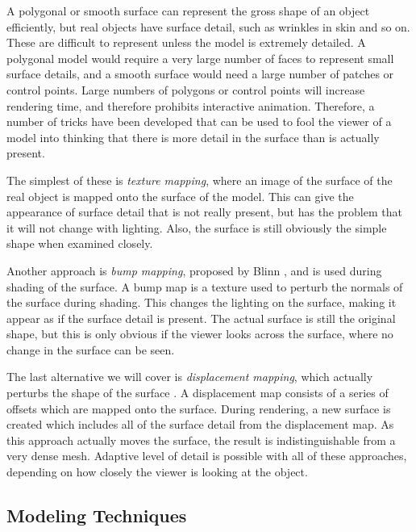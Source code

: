 \documentclass[10pt,oneside,fleqn,a4paper]{book}
\begin{document}
A polygonal or smooth surface can represent the gross shape of an object efficiently, but real objects have surface detail, such as wrinkles in skin and so on. These are difficult to represent unless the model is extremely detailed. A polygonal model would require a very large number of faces to represent small surface details, and a smooth surface would need a large number of patches or control points. Large numbers of polygons or control points will increase rendering time, and therefore prohibits interactive animation. Therefore, a number of tricks have been developed that can be used to fool the viewer of a model into thinking that there is more detail in the surface than is actually present.

The simplest of these is {\it texture mapping}, where an image of the surface of the real object is mapped onto the surface of the model. This can give the appearance of surface detail that is not really present, but has the problem that it will not change with lighting. Also, the surface is still obviously the simple shape when examined closely.

Another approach is {\it bump mapping}, proposed by Blinn \cite{Blinn78}, and is used during shading of the surface. A bump map is a texture used to perturb the normals of the surface during shading. This changes the lighting on the surface, making it appear as if the surface detail is present. The actual surface is still the original shape, but this is only obvious if the viewer looks across the surface, where no change in the surface can be seen.

The last alternative we will cover is {\it displacement mapping}, which actually perturbs the shape of the surface \cite{Cook84}. A displacement map consists of a series of offsets which are mapped onto the surface. During rendering, a new surface is created which includes all of the surface detail from the displacement map. As this approach actually moves the surface, the result is indistinguishable from a very dense mesh. Adaptive level of detail is possible with all of these approaches,  depending on how closely the viewer is looking at the object.

\subsection{\label{sec:reviewmodeling}Modeling Techniques}
\end{document}
